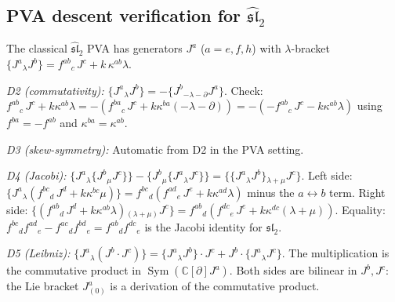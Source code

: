 \subsection{PVA descent verification for
$\widehat{\mathfrak{sl}}_2$}
\label{subsec:pva-descent-sl2}

\begin{computation}
\label{comp:pva-descent-sl2}
The classical $\widehat{\mathfrak{sl}}_2$ PVA has generators
$J^a$ ($a=e,f,h$) with $\lambda$-bracket
$\{J^a{}_\lambda J^b\}=f^{ab}{}_c\,J^c+k\,\kappa^{ab}\lambda$.

\emph{D2 (commutativity):}
$\{J^a{}_\lambda J^b\}=-\{J^b{}_{-\lambda-\partial} J^a\}$.
Check: $f^{ab}{}_c\,J^c+k\kappa^{ab}\lambda
=-(f^{ba}{}_c\,J^c+k\kappa^{ba}(-\lambda-\partial))
=-(-f^{ab}{}_c\,J^c-k\kappa^{ab}\lambda)$
using $f^{ba}=-f^{ab}$ and $\kappa^{ba}=\kappa^{ab}$. \checkmark

\emph{D3 (skew-symmetry):}
Automatic from D2 in the PVA setting. \checkmark

\emph{D4 (Jacobi):}
$\{J^a{}_\lambda\{J^b{}_\mu J^c\}\}
-\{J^b{}_\mu\{J^a{}_\lambda J^c\}\}
=\{\{J^a{}_\lambda J^b\}{}_{\lambda+\mu} J^c\}$.
Left side: $\{J^a{}_\lambda(f^{bc}{}_d\,J^d+k\kappa^{bc}\mu)\}
=f^{bc}{}_d(f^{ad}{}_e\,J^e+k\kappa^{ad}\lambda)$
minus the $a\leftrightarrow b$ term.
Right side:
$\{(f^{ab}{}_d\,J^d+k\kappa^{ab}\lambda){}_{(\lambda+\mu)} J^c\}
=f^{ab}{}_d(f^{dc}{}_e\,J^e+k\kappa^{dc}(\lambda+\mu))$.
Equality: $f^{bc}{}_d f^{ad}{}_e-f^{ac}{}_d f^{bd}{}_e
=f^{ab}{}_d f^{dc}{}_e$ is the Jacobi identity for
$\mathfrak{sl}_2$. \checkmark

\emph{D5 (Leibniz):}
$\{J^a{}_\lambda(J^b\cdot J^c)\}
=\{J^a{}_\lambda J^b\}\cdot J^c
+J^b\cdot\{J^a{}_\lambda J^c\}$.
The multiplication is the commutative product in
$\operatorname{Sym}(\mathbb C[\partial]J^a)$.
Both sides are bilinear in $J^b,J^c$: the Lie bracket
$J^a_{(0)}$ is a derivation of the commutative product. \checkmark
\end{computation}


